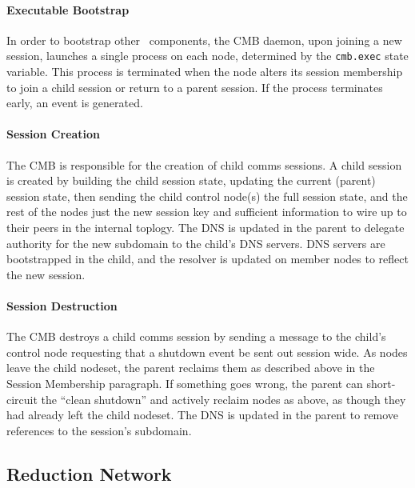 \paragraph{Executable Bootstrap}
In order to bootstrap other \ngrm\ components, the CMB daemon, upon
joining a new session, launches a single process on each node,
determined by the {\tt cmb.exec} state variable.
This process is terminated when the node alters its session membership
to join a child session or return to a parent session.
If the process terminates early, an event is generated.


\paragraph{Session Creation}
The CMB is responsible for the creation of
child comms sessions.
A child session is created by building the child session state,
updating the current (parent) session state, then sending the
child control node(s) the full session state, and the rest of the nodes
just the new session key and sufficient information to wire up to their
peers in the internal toplogy.
The DNS is updated in the parent to delegate authority
for the new subdomain to the child's DNS servers.
DNS servers are bootstrapped in the child, and the resolver is updated
on member nodes to reflect the new session.

\paragraph{Session Destruction}
The CMB destroys a child comms session by sending a message to the child's
control node requesting that a shutdown event be sent out session wide.
As nodes leave the child nodeset, the parent reclaims them as described 
above in the Session Membership paragraph.
If something goes wrong, the parent can short-circuit the ``clean shutdown''
and actively reclaim nodes as above, as though they had already left the
child nodeset.
The DNS is updated in the parent to remove references to the session's
subdomain.

\subsection{Reduction Network}

